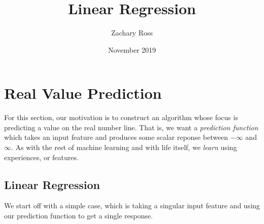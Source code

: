 \documentclass{book}[a5paper]
\title{Linear Regression}
\author{Zachary Ross}
\date{November 2019}
\begin{document}
\section{Real Value Prediction}

For this section, our motivation is to construct an algorithm whose focus is predicting a value on the real number line. That is, we want a \emph{prediction function} which takes an input feature and produces some scalar reponse between $-\infty$ and $\infty$. As with the rest of machine learning and with life itself, we \emph{learn} using experiences, or features.


\subsection{Linear Regression}

We start off with a simple case, which is taking a singular input feature and using our prediction function to get a single response. 
\end{document}
